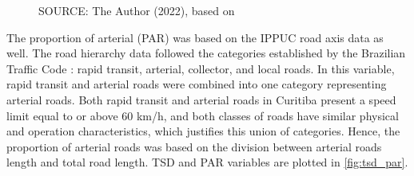\begin{figure}[!htbp]
\begin{subfigure}{0.5\textwidth}
    \end{subfigure}
    \label{fig:dis_dsc}
    \par SOURCE: The Author (2022), based on \textcite{IPPUC2018b,IPPUC2021,SETRAN2020}
\end{figure}

The proportion of arterial (PAR) was based on the IPPUC road axis data as well. The road hierarchy data followed the categories established by the Brazilian Traffic Code \cite{Brasil1997}: rapid transit, arterial, collector, and local roads. In this variable, rapid transit and arterial roads were combined into one category representing arterial roads. Both rapid transit and arterial roads in Curitiba present a speed limit equal to or above 60 km/h, and both classes of roads have similar physical and operation characteristics, which justifies this union of categories. Hence, the proportion of arterial roads was based on the division between arterial roads length and total road length. TSD and PAR variables are plotted in \autoref{fig:tsd_par}.

